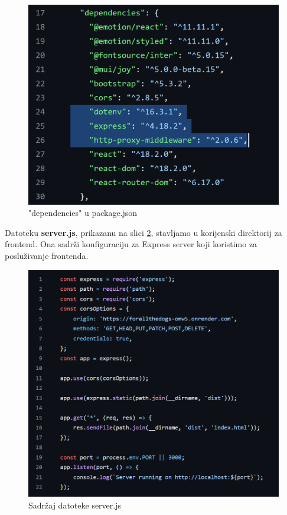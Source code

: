 			\begin{figure}[H]
				\includegraphics[scale=0.6]{slike/dependencies.PNG} 
				\centering
				\caption{"dependencies" u package.json}
				\label{dependencies}
			\end{figure}
			
			Datoteku \textbf{server.js}, prikazanu na slici \ref{server_js}, stavljamo u korijenski direktorij za frontend. Ona sadrži konfiguraciju za Express server koji koristimo za posluživanje frontenda.
			
			\begin{figure}[H]
				\includegraphics[scale=0.6]{slike/server_js.PNG} 
				\centering
				\caption{Sadržaj datoteke server.js}
				\label{server_js}
			\end{figure}
			
